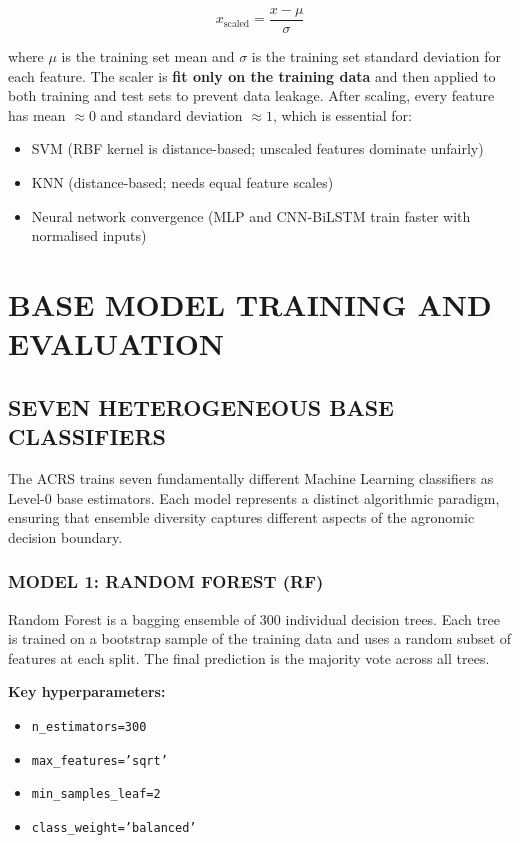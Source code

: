 \documentclass[12pt,a4paper,oneside]{report}
\begin{document}
\begin{equation}
x_{\text{scaled}} = \frac{x - \mu}{\sigma}
\end{equation}

where $\mu$ is the training set mean and $\sigma$ is the training set standard deviation for each feature. The scaler is \textbf{fit only on the training data} and then applied to both training and test sets to prevent data leakage. After scaling, every feature has mean $\approx 0$ and standard deviation $\approx 1$, which is essential for:
\begin{itemize}[leftmargin=*, label=$\bullet$]
  \item SVM (RBF kernel is distance-based; unscaled features dominate unfairly)
  \item KNN (distance-based; needs equal feature scales)
  \item Neural network convergence (MLP and CNN-BiLSTM train faster with normalised inputs)
\end{itemize}

\chapter{BASE MODEL TRAINING AND EVALUATION}

\section{SEVEN HETEROGENEOUS BASE CLASSIFIERS}

The ACRS trains seven fundamentally different Machine Learning classifiers as Level-0 base estimators. Each model represents a distinct algorithmic paradigm, ensuring that ensemble diversity captures different aspects of the agronomic decision boundary.

\subsection{MODEL 1: RANDOM FOREST (RF)}
Random Forest is a bagging ensemble of 300 individual decision trees. Each tree is trained on a bootstrap sample of the training data and uses a random subset of features at each split. The final prediction is the majority vote across all trees.

\textbf{Key hyperparameters:}
\begin{singlespacing}
\begin{itemize}[leftmargin=2cm, label={}, itemsep=0pt]
  \item \texttt{n\_estimators=300}
  \item \texttt{max\_features='sqrt'}
  \item \texttt{min\_samples\_leaf=2}
  \item \texttt{class\_weight='balanced'}
\end{itemize}
\end{singlespacing}
\end{document}
